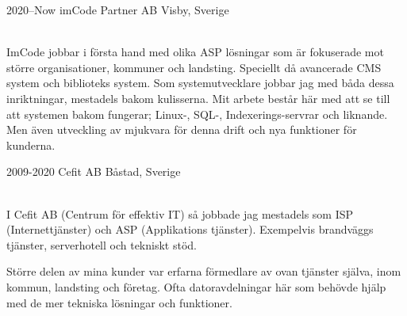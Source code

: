 \documentclass[]{cv-style}          %
\begin{document}
\begin{entrylist}
\entry
  {2020--Now}
  {imCode Partner AB}
  {Visby, Sverige}
  {\\
      ImCode jobbar i första hand med olika ASP lösningar som är fokuserade
      mot större organisationer, kommuner och landsting. Speciellt då avancerade
      CMS system och biblioteks system. Som systemutvecklare jobbar jag med
      båda dessa inriktningar, mestadels bakom kulisserna. Mit arbete består
      här med att se till att systemen bakom fungerar; Linux-, SQL-, 
      Indexerings-servrar och liknande. Men även utveckling av mjukvara för
      denna drift och nya funktioner för kunderna.


  }
\entry
  {2009-2020}
  {Cefit AB}
  {Båstad, Sverige}
  {\\
      I Cefit AB (Centrum för effektiv IT) så jobbade jag mestadels som 
      ISP (Internettjänster) och ASP (Applikations tjänster). Exempelvis
      brandväggs tjänster, serverhotell och tekniskt stöd.

      Större delen av mina kunder var erfarna förmedlare av ovan tjänster
      själva, inom kommun, landsting och företag. Ofta datoravdelningar 
      här som behövde hjälp med de mer tekniska lösningar och funktioner.
      
}
\end{entrylist}
\end{document}
